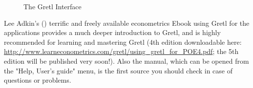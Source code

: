 \documentclass[11pt]{article}
\begin{document}
\begin{figure}[h!]
	\centering
	
	
	\caption{The Gretl Interface}
	\label{fig:GUI}
\end{figure}


Lee Adkin's (\citeyear{Adkins2014}) terrific and freely available econometrics Ebook using Gretl for the applications provides a much deeper introduction to Gretl, and is highly recommended for learning and mastering Gretl (4th edition downloadable here: \\ \url{http://www.learneconometrics.com/gretl/using_gretl_for_POE4.pdf}; the 5th edition will be published very soon!). Also the manual, which can be opened from the "Help, User's guide" menu, is the first source you should check in case of questions or problems.
\end{document}
